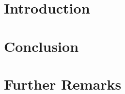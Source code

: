 \documentclass[12pt]{article}
\begin{document}
    \section{Introduction}
    \section{Conclusion}
    \section{Further Remarks}
\end{document}
